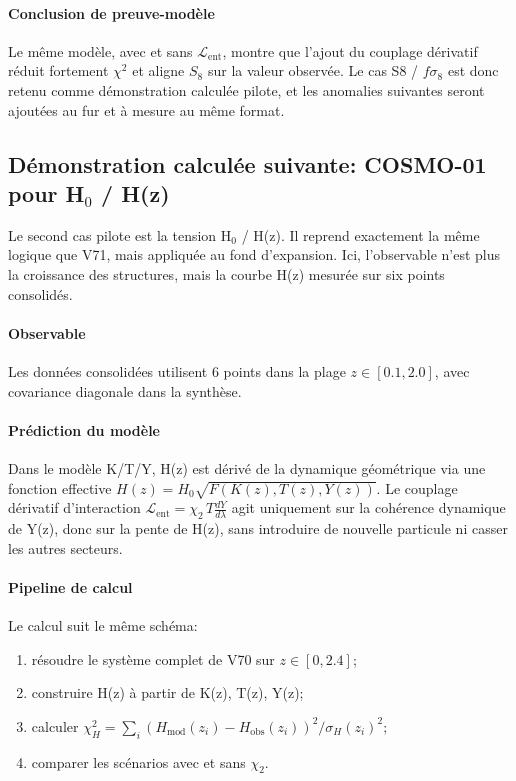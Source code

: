 \documentclass[11pt,a4paper]{article}
\newcommand{\Lent}{\mathcal{L}_{\mathrm{ent}}}
\begin{document}
\paragraph{Conclusion de preuve-modèle}
Le même modèle, avec et sans $\Lent$, montre que l'ajout du couplage dérivatif réduit fortement $\chi^2$ et aligne $S_8$ sur la valeur observée. Le cas S8 / $f\sigma_8$ est donc retenu comme démonstration calculée pilote, et les anomalies suivantes seront ajoutées au fur et à mesure au même format.

\subsection{Démonstration calculée suivante: COSMO-01 pour H$_0$ / H(z)}
Le second cas pilote est la tension H$_0$ / H(z). Il reprend exactement la même logique que V71, mais appliquée au fond d'expansion. Ici, l'observable n'est plus la croissance des structures, mais la courbe H(z) mesurée sur six points consolidés.

\paragraph{Observable}
Les données consolidées utilisent 6 points dans la plage $z \in [0.1, 2.0]$, avec covariance diagonale dans la synthèse.

\paragraph{Prédiction du modèle}
Dans le modèle K/T/Y, H(z) est dérivé de la dynamique géométrique via une fonction effective $H(z)=H_0\sqrt{F(K(z),T(z),Y(z))}$.
Le couplage dérivatif d'interaction $\Lent=\chi_2\,T\frac{dY}{d\lambda}$ agit uniquement sur la cohérence dynamique de Y(z), donc sur la pente de H(z), sans introduire de nouvelle particule ni casser les autres secteurs.

\paragraph{Pipeline de calcul}
Le calcul suit le même schéma:
\begin{enumerate}
	\item résoudre le système complet de V70 sur $z \in [0,2.4]$;
	\item construire H(z) à partir de K(z), T(z), Y(z);
	\item calculer $\chi^2_H=\sum_i (H_{\mathrm{mod}}(z_i)-H_{\mathrm{obs}}(z_i))^2/\sigma_H(z_i)^2$;
	\item comparer les scénarios avec et sans $\chi_2$.
\end{enumerate}
\end{document}
